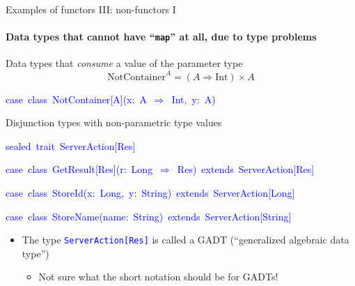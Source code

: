 \documentclass[english]{beamer}
\newenvironment{lyxcode}
   {\par\begin{list}{}{
     \setlength{\rightmargin}{\leftmargin}
     \setlength{\listparindent}{0pt}%
     \raggedright
     \setlength{\itemsep}{0pt}
     \setlength{\parsep}{0pt}
     \normalfont\ttfamily}%
    \def\{{\char`\{}
    \def\}{\char`\}}
    \def\textasciitilde{\char`\~}
    \item[]}
   {\end{list}}
\begin{document}
\begin{frame}{Examples of functors III: non-functors I}


\framesubtitle{Data types that cannot have ``\texttt{map}'' at all, due to type
problems}
\begin{enumerate}
\item Data types that \emph{consume} a value of the parameter type
\[
\text{NotContainer}^{A}=\left(A\Rightarrow\text{Int}\right)\times A
\]

\begin{lyxcode}
\textcolor{blue}{\footnotesize{}case~class~NotContainer{[}A{]}(x:~A~$\Rightarrow$~Int,~y:~A)}{\footnotesize \par}
\end{lyxcode}
\item Disjunction types with non-parametric type values
\end{enumerate}
\begin{lyxcode}
\textcolor{blue}{\footnotesize{}sealed~trait~ServerAction{[}Res{]}}{\footnotesize \par}

\textcolor{blue}{\footnotesize{}case~class~GetResult{[}Res{]}(r:~Long~$\Rightarrow$~Res)~extends~ServerAction{[}Res{]}}{\footnotesize \par}

\textcolor{blue}{\footnotesize{}case~class~StoreId(x:~Long,~y:~String)~extends~ServerAction{[}Long{]}}{\footnotesize \par}

\textcolor{blue}{\footnotesize{}case~class~StoreName(name:~String)~extends~ServerAction{[}String{]}}{\footnotesize \par}
\end{lyxcode}
\begin{itemize}
\item The type \texttt{\textcolor{blue}{\footnotesize{}ServerAction{[}Res{]}}}
is called a GADT (``generalized algebraic data type'')
\begin{itemize}
\item Not sure what the short notation should be for GADTs!
\end{itemize}
\end{itemize}
\end{frame}
\end{document}
